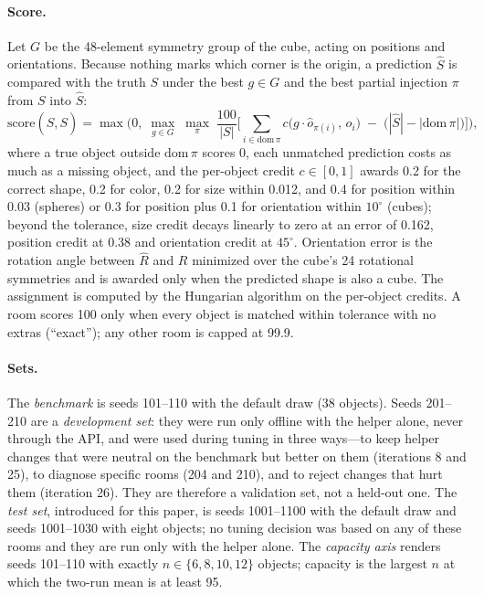 \documentclass[10pt,a4paper]{article}
\begin{document}
\paragraph{Score.}
Let $G$ be the 48-element symmetry group of the cube, acting on positions and orientations. Because nothing marks which corner is the origin, a prediction $\hat S$ is compared with the truth $S$ under the best $g\in G$ and the best partial injection $\pi$ from $S$ into $\hat S$:
\begin{equation}
\mathrm{score}(\hat S,S)=\max\Big(0,\;\max_{g\in G}\;\max_{\pi}\;\frac{100}{|S|}\Big[\sum_{i\in\mathrm{dom}\,\pi} c\big(g\cdot\hat o_{\pi(i)},\,o_i\big)\;-\;\big(|\hat S|-|\mathrm{dom}\,\pi|\big)\Big]\Big),
\label{eq:score}
\end{equation}
where a true object outside $\mathrm{dom}\,\pi$ scores 0, each unmatched prediction costs as much as a missing object, and the per-object credit $c\in[0,1]$ awards 0.2 for the correct shape, 0.2 for color, 0.2 for size within 0.012, and 0.4 for position within 0.03 (spheres) or 0.3 for position plus 0.1 for orientation within $10^\circ$ (cubes); beyond the tolerance, size credit decays linearly to zero at an error of 0.162, position credit at 0.38 and orientation credit at $45^\circ$. Orientation error is the rotation angle between $\hat R$ and $R$ minimized over the cube's 24 rotational symmetries and is awarded only when the predicted shape is also a cube. The assignment is computed by the Hungarian algorithm on the per-object credits. A room scores 100 only when every object is matched within tolerance with no extras (``exact''); any other room is capped at 99.9.

\paragraph{Sets.}
The \emph{benchmark} is seeds 101--110 with the default draw (38 objects). Seeds 201--210 are a \emph{development set}: they were run only offline with the helper alone, never through the API, and were used during tuning in three ways---to keep helper changes that were neutral on the benchmark but better on them (iterations 8 and 25), to diagnose specific rooms (204 and 210), and to reject changes that hurt them (iteration 26). They are therefore a validation set, not a held-out one. The \emph{test set}, introduced for this paper, is seeds 1001--1100 with the default draw and seeds 1001--1030 with eight objects; no tuning decision was based on any of these rooms and they are run only with the helper alone. The \emph{capacity axis} renders seeds 101--110 with exactly $n\in\{6,8,10,12\}$ objects; capacity is the largest $n$ at which the two-run mean is at least 95.
\end{document}
